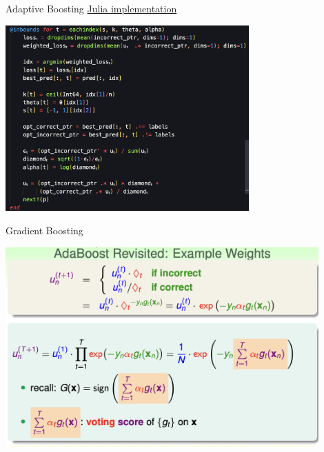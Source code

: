 \documentclass[
  ignorenonframetext,
]{beamer}
\begin{document}
\begin{frame}{Adaptive Boosting}
  \href{https://github.com/githubjacky/HTML/blob/main/hw5/utils.jl}{Julia implementation}
  \begin{center}
    \includegraphics[width=0.7\textwidth]{figure/pdf/adaboost.png}
  \end{center}
\end{frame}


\begin{frame}{Gradient Boosting}
  \begin{center}
    \includegraphics[width=0.9\textwidth]{figure/pdf/gbm.png}
  \end{center}
\end{frame}
\end{document}
